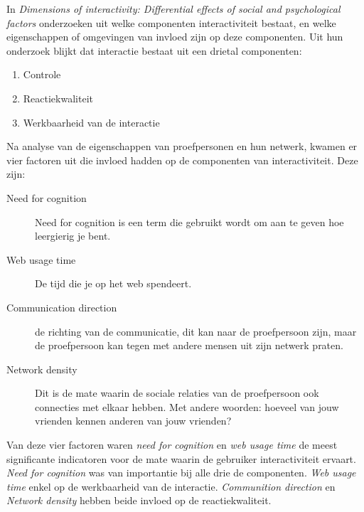 \documentclass[a4paper, 10pt, pdftex]{article}
\begin{document}
      In \emph{Dimensions of interactivity: Differential effects of social and psychological factors} onderzoeken \citeauthor{Sohn2005} uit welke componenten interactiviteit bestaat, en welke eigenschappen of omgevingen van invloed zijn op deze componenten. Uit hun onderzoek blijkt dat interactie bestaat uit een drietal componenten:
        \begin{enumerate}
          \item Controle
          \item Reactiekwaliteit
          \item Werkbaarheid van de interactie
        \end{enumerate}
      Na analyse van de eigenschappen van proefpersonen en hun netwerk, kwamen er vier factoren uit die invloed hadden op de componenten van interactiviteit. Deze zijn:
        \begin{description}
          \item[Need for cognition]
            Need for cognition is een term die gebruikt wordt om aan te geven hoe leergierig je bent.
          \item[Web usage time]
            De tijd die je op het web spendeert.
          \item[Communication direction]
            de richting van de communicatie, dit kan naar de proefpersoon zijn, maar de proefpersoon kan tegen met andere mensen uit zijn netwerk praten.
          \item[Network density]
            Dit is de mate waarin de sociale relaties van de proefpersoon ook connecties met elkaar hebben. Met andere woorden: hoeveel van jouw vrienden kennen anderen van jouw vrienden?
        \end{description}
        Van deze vier factoren waren \emph{need for cognition} en \emph{web usage time} de meest significante indicatoren voor de mate waarin de gebruiker interactiviteit ervaart. \emph{Need for cognition} was van importantie bij alle drie de componenten. \emph{Web usage time} enkel op de werkbaarheid van de interactie. \emph{Communition direction} en \emph{Network density} hebben beide invloed op de reactiekwaliteit.
\end{document}
